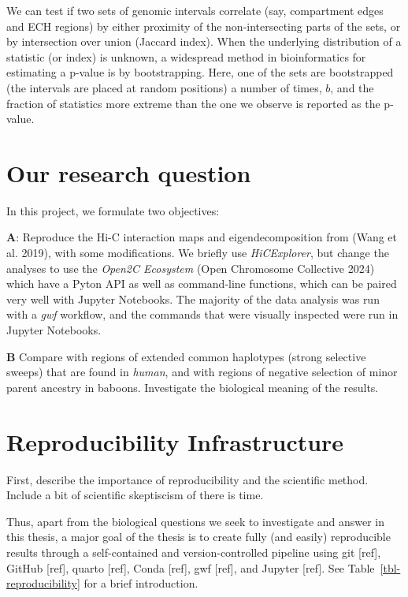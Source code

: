 \documentclass[
  11pt,
  a4paper,
]{scrbook}
\renewenvironment{quote}{\begin{myquote}}{\end{myquote}}
\let\oldemph\emph
\renewcommand\emph[1]{\oldemph{\color{gray}#1}}
\begin{document}
We can test if two sets of genomic intervals correlate (say, compartment
edges and ECH regions) by either proximity of the non-intersecting parts
of the sets, or by intersection over union (Jaccard index). When the
underlying distribution of a statistic (or index) is unknown, a
widespread method in bioinformatics for estimating a p-value is by
bootstrapping. Here, one of the sets are bootstrapped (the intervals are
placed at random positions) a number of times, \(b\), and the fraction
of statistics more extreme than the one we observe is reported as the
p-value.

\section{Our research question}\label{our-research-question}

In this project, we formulate two objectives:

\textbf{A}: Reproduce the Hi-C interaction maps and eigendecomposition
from (Wang et al. 2019), with some modifications. We briefly use
\emph{HiCExplorer}, but change the analyses to use the \emph{Open2C
Ecosystem} (Open Chromosome Collective 2024) which have a Pyton API as
well as command-line functions, which can be paired very well with
Jupyter Notebooks. The majority of the data analysis was run with a
\emph{gwf} workflow, and the commands that were visually inspected were
run in Jupyter Notebooks.

\textbf{B} Compare with regions of extended common haplotypes (strong
selective sweeps) that are found in \emph{human}, and with regions of
negative selection of minor parent ancestry in baboons. Investigate the
biological meaning of the results.

\section{Reproducibility
Infrastructure}\label{reproducibility-infrastructure}

\begin{quote}
First, describe the importance of reproducibility and the scientific
method. Include a bit of scientific skeptiscism of there is time.
\end{quote}

Thus, apart from the biological questions we seek to investigate and
answer in this thesis, a major goal of the thesis is to create fully
(and easily) reproducible results through a self-contained and
version-controlled pipeline using git {[}ref{]}, GitHub {[}ref{]},
quarto {[}ref{]}, Conda {[}ref{]}, gwf {[}ref{]}, and Jupyter {[}ref{]}.
See Table~\ref{tbl-reproducibility} for a brief introduction.
\end{document}
